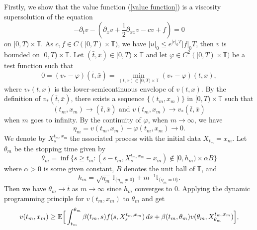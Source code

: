 \documentclass[12pt,a4paper]{ctexart}
\begin{document}
Firstly, we show that the value function (\ref{value function}) is a viscosity supersolution of the equation
\begin{equation*}
    - \partial_{t} v - ( \partial_{x} v + \frac{1}{2} \partial_{xx} v - c v + f) = 0
\end{equation*}
on $[0, T) \times \mathbb{T}$. As $c, f \in C([0, T) \times \mathbb{T})$, we have $|u|_{0} \leq e^{|c|_{0}T}|f|_{0}T$, then $v$ is bounded on $[0, T) \times \mathbb{T}$. Let $(\bar t, \bar x) \in [0, T) \times \mathbb{T}$ and let $\varphi \in C^{2} ([0, T) \times \mathbb{T})$ be a test function such that 
\begin{equation}
    0 = (v_{*} - \varphi) (\bar t, \bar x) = \min_{(t, x) \in [0, T) \times \mathbb{T}} (v_{*} - \varphi) (t,x),
\end{equation}
where $v_{*}(t,x)$ is the lower-semicontinuous envelope of $v(t,x)$. By the definition of $v_{*}(\bar t, \bar x)$, there exists a sequence $\{(t_{m}, x_m)\}$ in $[0, T) \times \mathbb{T}$ such that
\begin{equation*}
    (t_m, x_m) \to (\bar t, \bar x) \,\, \text{and} \, \, v(t_m, x_{m}) \to v_{*} (\bar t, \bar x)
\end{equation*}
when $m$ goes to infinity. By the continuity of $\varphi$, when $m \to \infty$, we have
\begin{equation*}
    \eta_{m} = v(t_m, x_m) - \varphi(t_m, x_m) \to 0.
\end{equation*}
We denote by $X_{s}^{t_m, x_m}$ the associated process with the initial data $X_{t_m} = x_{m}$. Let $\theta_{m}$ be the stopping time given by
\begin{equation}
    \theta_{m} = \inf \{s \geq t_{m} : (s - t_{m}, X_{s}^{t_m, x_m} - x_m) \notin [0, h_m) \times \alpha B \}
\end{equation}
where $\alpha > 0$ is some given constant, $B$
 denotes the unit ball of $\mathbb{T}$, and
 \begin{equation*}
     h_{m} = \sqrt{\eta_{m}}\, \mathbb{I}_{\{\eta_{m} \neq 0\}} + m^{-1} \mathbb{I}_{\{\eta_{m} = 0\}}.
 \end{equation*}
Then we have $\theta_{m} \to \bar t$ as $m \to \infty$ since $h_m$ converges to $0$. Applying the dynamic programming principle for $v(t_m, x_m)$ to $\theta_m$ and get
\begin{equation*}
    v(t_m, x_m) \geq \mathbb{E} \Big{[} \int_{t_m}^{\theta_m} \beta(t_m, s) f(s, X_{s}^{t_m, x_m}) \, d s + \beta(t_m, \theta_m) v(\theta_m, X_{\theta_m}^{t_m, x_m}) \Big{]},
\end{equation*}
\end{document}
